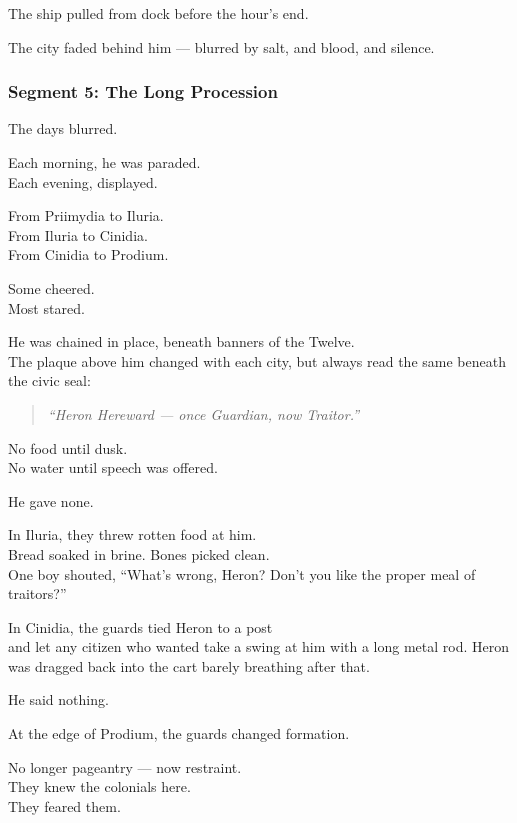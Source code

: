 \documentclass[9pt]{article}
\begin{document}
The ship pulled from dock before the hour’s end.

The city faded behind him — blurred by salt, and blood, and silence.

\newpage

\subsubsection*{Segment 5: The Long Procession}

The days blurred.

Each morning, he was paraded.\\
Each evening, displayed.

From Priimydia to Iluria.\\
From Iluria to Cinidia.\\
From Cinidia to Prodium.

Some cheered.\\
Most stared.

He was chained in place, beneath banners of the Twelve.\\
The plaque above him changed with each city, but always read the same beneath the civic seal:

\begin{quote}
\textit{“Heron Hereward — once Guardian, now Traitor.”}
\end{quote}

No food until dusk.\\
No water until speech was offered.

He gave none.

\vspace{1em}

In Iluria, they threw rotten food at him.\\
Bread soaked in brine. Bones picked clean.\\
One boy shouted, “What’s wrong, Heron? Don’t you like the proper meal of traitors?”

In Cinidia, the guards tied Heron to a post\\
and let any citizen who wanted take a swing at him with a long metal rod. Heron was dragged back into the cart barely breathing after that.

He said nothing.

\vspace{1em}

At the edge of Prodium, the guards changed formation.

No longer pageantry — now restraint.\\
They knew the colonials here.\\
They feared them.
\end{document}
